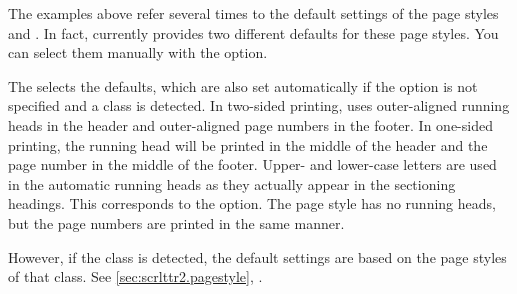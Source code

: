 \begin{Declaration}
\end{Declaration}
%
%
The examples above refer several times to the default settings of the page
styles 
and %
. In fact, 
currently provides two different defaults for these page styles. You can
select them manually with the  option.

The  
selects the defaults, which are also set automatically if the
option is not specified and a \KOMAScript{} class is detected. In two-sided
printing,  uses outer-aligned
running heads in the header and outer-aligned page numbers in the footer.
In one-sided printing, the running head will be printed in the
middle of the header and the page number in the middle of the footer. Upper-
and lower-case letters are used in the automatic running heads as they
actually appear in the sectioning headings. This corresponds to the
%
 option. The
 page style has no running
heads, but the page numbers are printed in the same manner.

However, if the \hyperref[cha:scrlttr2]{}%
%
 class is detected, the default settings are based on the
page styles of that class. See \autoref{sec:scrlttr2.pagestyle}, 
.

